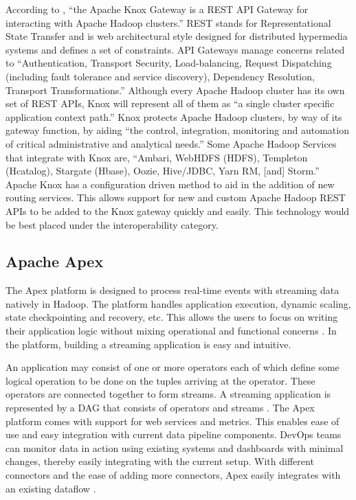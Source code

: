      According to \cite{knox}, ``the Apache Knox Gateway is a REST API
     Gateway for interacting with Apache Hadoop clusters.'' REST stands
     for Representational State Transfer and is web architectural
     style designed for distributed hypermedia systems and defines a
     set of constraints. \cite{fielding} API Gateways manage concerns
     related to ``Authentication, Transport Security, Load-balancing,
     Request Dispatching (including fault tolerance and service
     discovery), Dependency Resolution, Transport Transformations.''
     \cite{peyrott} Although every Apache Hadoop cluster has its own
     set of REST APIs, Knox will represent all of them as ``a single
     cluster specific application context path.'' \cite{knox} Knox
     protects Apache Hadoop clusters, by way of its gateway function,
     by aiding ``the control, integration, monitoring and automation of
     critical administrative and analytical needs.'' \cite{knox} Some
     Apache Hadoop Services that integrate with Knox are, ``Ambari,
     WebHDFS (HDFS), Templeton (Hcatalog), Stargate (Hbase), Oozie,
     Hive/JDBC, Yarn RM, [and] Storm.''  \cite{knox} Apache Knox has a
     configuration driven method to aid in the addition of new routing
     services. \cite{knox} This allows support for new and custom
     Apache Hadoop REST APIs to be added to the Knox gateway quickly
     and easily. \cite{knox} This technology would be best placed
     under the interoperability category.

\subsection{Apache Apex}

     The Apex platform is designed to process real-time events with
     streaming data natively in Hadoop. The platform handles
     application execution, dynamic scaling, state checkpointing and
     recovery, etc. This allows the users to focus on writing their
     application logic without mixing operational and functional
     concerns \cite{apache-apex}. In the platform, building a
     streaming application is easy and intuitive.

     An application may consist of one or more operators each of which
     define some logical operation to be done on the tuples arriving
     at the operator. These operators are connected together to form
     streams. A streaming application is represented by a DAG that
     consists of operators and streams \cite{apex-operators}. The
     Apex platform comes with support for web services and
     metrics. This enables ease of use and easy integration with
     current data pipeline components. DevOps teams can monitor data
     in action using existing systems and dashboards with minimal
     changes, thereby easily integrating with the current setup. With
     different connectors and the ease of adding more connectors, Apex
     easily integrates with an existing dataflow \cite{apex-ease}.

